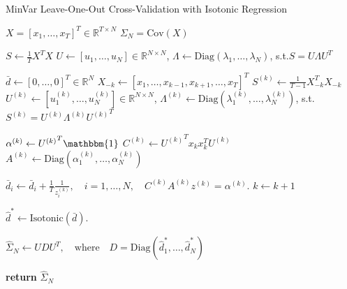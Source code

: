 \documentclass{article}
\begin{document}
\begin{algorithm}
	\caption{MinVar Leave-One-Out Cross-Validation with Isotonic Regression}
	\label{alg:minvar_loo_cv}
	\begin{algorithmic}[1]
	\Require $X = [x_1, \ldots, x_T]^T \in \mathbb{R}^{T\times N}$
	\Require $\Sigma_N = \mathrm{Cov}(X)$

		\State $S \gets \frac1T X^T X$
		\State 
				$U \gets [u_1, \ldots, u_N] \in \mathbb{R}^{N\times N}$,
				\quad $\Lambda \gets \mathrm{Diag}(\lambda_1, \ldots, \lambda_N)$,
				\quad \mbox{s.t.}\quad $S = U \Lambda {U}^T$

		\State $\bar{d} \gets [0, \ldots, 0]^T \in \mathbb{R}^{N}$
			\State $X_{-k} \gets [x_1, \ldots, x_{k-1}, x_{k+1}, \ldots, x_T]^T$
			\State $S^{(k)} \gets \frac{1}{T-1} X_{-k}^T X_{-k} $
			\State 
				$U^{(k)} \gets [u^{(k)}_1, \ldots, u^{(k)}_N] \in \mathbb{R}^{N\times N}$,
				\quad $\Lambda^{(k)} 
					\gets \mathrm{Diag}(\lambda^{(k)}_1, \ldots, \lambda^{(k)}_N)$,
				\quad \mbox{s.t.}\quad $S^{(k)} = U^{(k)} \Lambda^{(k)} {U^{(k)}}^T$

			\State $\alpha^{(k)} \gets {U^{(k)}}^T\mathbbm{1}$
			\State $C^{(k)} \gets {U^{(k)}}^T x_k x_k^T U^{(k)}$
			\State $A^{(k)} \gets \mathrm{Diag}(\alpha^{(k)}_1, \ldots, \alpha^{(k)}_N)$


			\State $\bar{d}_i \gets \bar{d}_i 
				+ \frac1T \frac{1}{z^{(k)}_i}, \quad i = 1, \ldots, N, 
					\quad C^{(k)} A^{(k)} z^{(k)} = \alpha^{(k)}.$
			\State $k \gets k+1$
		\EndWhile

		\State $\hat{d}^* \gets \mathrm{Isotonic}(\bar{d}).$ 

		\State $\hat{\Sigma}_N \gets UDU^T, \quad 
			\mbox{where}\quad D = \mathrm{Diag}(\hat{d}^*_1, \ldots, \hat{d}^*_N)$

		\State \textbf{return} $\hat{\Sigma}_N$ 
	\EndProcedure
	\end{algorithmic}
\end{algorithm}
\end{document}
